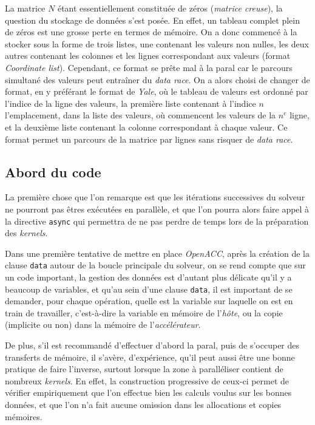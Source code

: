 \documentclass{article}
\begin{document}
La matrice $N$ étant essentiellement constituée de zéros (\textit{matrice creuse}), la question du stockage de données s'est posée. En effet, un tableau complet plein de zéros est une grosse perte en termes de mémoire. On a donc commencé à la stocker sous la forme de trois listes, une contenant les valeurs non nulles, les deux autres contenant les colonnes et les lignes correspondant aux valeurs (format \textit{Coordinate list}). Cependant, ce format se prête mal à la \gls{paral} car le parcours simultané des valeurs peut entraîner du \textit{data race}. On a alors choisi de changer de format, en y préférant le format de \textit{Yale}, où le tableau de valeurs est ordonné par l'indice de la ligne des valeurs, la première liste contenant à l'indice $n$ l'emplacement, dans la liste des valeurs, où commencent les valeurs de la $n^e$ ligne, et la deuxième liste contenant la colonne correspondant à chaque valeur. Ce format permet un parcours de la matrice par lignes sans risquer de \textit{data race}.

\subsection{Abord du code}

La première chose que l'on remarque est que les itérations successives du solveur ne pourront pas êtres exécutées en parallèle, et que l'on pourra alors faire appel à la directive \texttt{async} qui permettra de ne pas perdre de temps lors de la préparation des \textit{kernels}.

Dans une première tentative de mettre en place \textit{OpenACC}, après la création de la clause \texttt{data} autour de la boucle principale du solveur, on se rend compte que sur un code important, la gestion des données est d'autant plus délicate qu'il y a beaucoup de variables, et qu'au sein d'une clause \texttt{data}, il est important de se demander, pour chaque opération, quelle est la variable sur laquelle on est en train de travailler, c'est-à-dire la variable en mémoire de l'\textit{hôte}, ou la copie (implicite ou non) dans la mémoire de l'\textit{accélérateur}.

De plus, s'il est recommandé d'effectuer d'abord la \gls{paral}, puis de s'occuper des transferts de mémoire, il s'avère, d'expérience, qu'il peut aussi être une bonne pratique de faire l'inverse, surtout lorsque la zone à paralléliser contient de nombreux \textit{kernels}. En effet, la construction progressive de ceux-ci permet de vérifier empiriquement que l'on effectue bien les calculs voulus sur les bonnes données, et que l'on n'a fait aucune omission dans les allocations et copies mémoires. 
\end{document}

